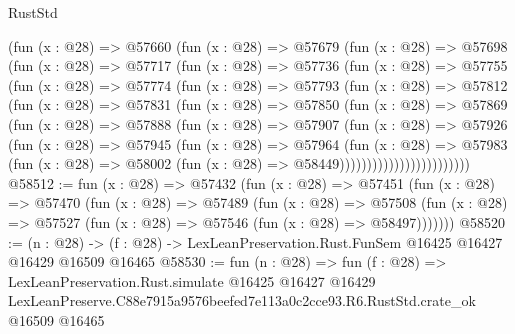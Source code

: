 \begin{lexlean}{RustStd}
\begin{coremodule}
            (fun (x : @28) =>
            @57660
              (fun (x : @28) =>
              @57679
                (fun (x : @28) =>
                @57698
                  (fun (x : @28) =>
                  @57717
                    (fun (x : @28) =>
                    @57736
                      (fun (x : @28) =>
                      @57755
                        (fun (x : @28) =>
                        @57774
                          (fun (x : @28) =>
                          @57793
                            (fun (x : @28) =>
                            @57812
                              (fun (x : @28) =>
                              @57831
                                (fun (x : @28) =>
                                @57850
                                  (fun (x : @28) =>
                                  @57869
                                    (fun (x : @28) =>
                                    @57888
                                      (fun (x : @28) =>
                                      @57907
                                        (fun (x : @28) =>
                                        @57926
                                          (fun (x : @28) =>
                                          @57945
                                            (fun (x : @28) =>
                                            @57964
                                              (fun (x : @28) =>
                                              @57983
                                                (fun (x : @28) =>
                                                @58002
                                                  (fun (x : @28) => @58449))))))))))))))))))))))))
@58512 := fun (x : @28) =>
  @57432
    (fun (x : @28) =>
    @57451
      (fun (x : @28) =>
      @57470
        (fun (x : @28) =>
        @57489
          (fun (x : @28) =>
          @57508 (fun (x : @28) => @57527 (fun (x : @28) => @57546 (fun (x : @28) => @58497)))))))
@58520 := (n : @28) ->
  (f : @28) -> LexLeanPreservation.Rust.FunSem @16425 @16427 @16429 @16509 @16465
@58530 := fun (n : @28) =>
  fun (f : @28) =>
  LexLeanPreservation.Rust.simulate
    @16425
    @16427
    @16429
    LexLeanPreserve.C88e7915a9576beefed7e113a0c2cce93.R6.RustStd.crate_ok
    @16509
    @16465
\end{coremodule}
\end{lexlean}
